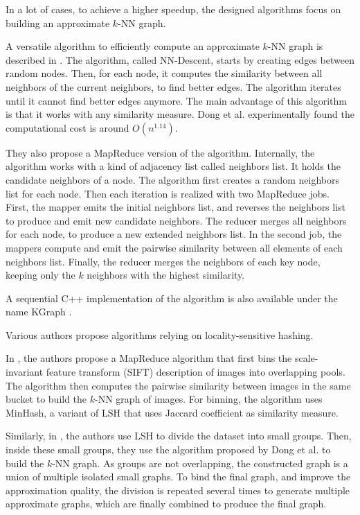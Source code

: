 \documentclass[wcp]{jmlr}
\begin{document}
In a lot of cases, to achieve a higher speedup, the designed algorithms focus on building an approximate $k$-NN graph.

A versatile algorithm to efficiently compute an approximate $k$-NN graph is described in \cite{Dong2011}. The algorithm, called NN-Descent, starts by creating edges between random nodes. Then, for each node, it computes the similarity between all neighbors of the current neighbors, to find better edges. The algorithm iterates until it cannot find better edges anymore. The main advantage of this algorithm is that it works with any similarity measure. Dong et al. experimentally found the computational cost is around $O(n^{1.14})$.

They also propose a MapReduce version of the algorithm. Internally, the algorithm works with a kind of adjacency list called neighbors list. It holds the candidate neighbors of a node. The algorithm first creates a random neighbors list for each node. Then each iteration is realized with two MapReduce jobs. First, the mapper emits the initial neighbors list, and reverses the neighbors list to produce and emit new candidate neighbors. The reducer merges all neighbors for each node, to produce a new extended neighbors list. In the second job, the mappers compute and emit the pairwise similarity between all elements of each neighbors list. Finally, the reducer merges the neighbors of each key node, keeping only the $k$ neighbors with the highest similarity.

A sequential C++ implementation of the algorithm is also available under the name KGraph \cite{kgraph}.

Various authors propose algorithms relying on locality-sensitive hashing.

In \cite{Hsieh2012}, the authors propose a MapReduce algorithm that first bins the scale-invariant feature transform (SIFT) description of images into overlapping pools. The algorithm then computes the pairwise similarity between images in the same bucket to build the $k$-NN graph of images. For binning, the algorithm uses MinHash, a variant of LSH that uses Jaccard coefficient as similarity measure.

Similarly, in \cite{Zhang2013}, the authors use LSH to divide the dataset into small groups. Then, inside these small groups, they use the algorithm proposed by Dong et al. to build the $k$-NN graph. As groups are not overlapping, the constructed graph is a union of multiple isolated small graphs. To bind the final graph, and improve the approximation quality, the division is repeated several times to generate multiple approximate graphs, which are finally combined to produce the final graph.
\end{document}
